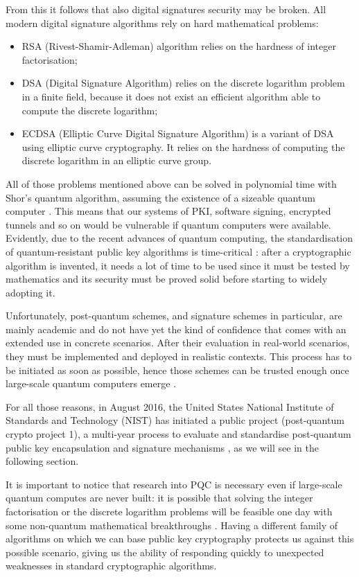 \documentclass[a4paper,12pt]{article}
\begin{document}
From this it follows that also digital signatures security may be broken. All modern digital signature algorithms rely on hard mathematical problems:
\begin{itemize}
	\item RSA (Rivest-Shamir-Adleman) algorithm relies on the hardness of integer factorisation;
	\item DSA (Digital Signature Algorithm) relies on the discrete logarithm problem in a finite field, because it does not exist an efficient algorithm able to compute the discrete logarithm;
	\item ECDSA (Elliptic Curve Digital Signature Algorithm) is a variant of DSA using elliptic curve cryptography. It relies on the hardness of computing the discrete logarithm in an elliptic curve group.
\end{itemize}

All of those problems mentioned above can be solved in polynomial time with Shor's quantum algorithm, assuming the existence of a sizeable quantum computer \cite{5_postquantum_signature_usecase}.
This means that our systems of PKI, software signing, encrypted tunnels and so on would be vulnerable if quantum computers were available.
Evidently, due to the recent advances of quantum computing, the standardisation of quantum-resistant public key algorithms is time-critical \cite{5_postquantum_signature_usecase}: after a cryptographic algorithm is invented, it needs a lot of time to be used since it must be tested by mathematics and its security must be proved solid before starting to widely adopting it.

Unfortunately, post-quantum schemes, and signature schemes in particular, are mainly academic and do not have yet the kind of confidence that comes with an extended use in concrete scenarios. After their evaluation in real-world scenarios, they must be implemented and deployed in realistic contexts. This process has to be initiated as soon as possible, hence those schemes can be trusted enough once large-scale quantum computers emerge \cite{9_postquantum_auth_openssl}.

For all those reasons, in August 2016, the United States National Institute of Standards and Technology (NIST) has initiated a public project (post-quantum crypto project 1), a multi-year process to evaluate and standardise post-quantum public key encapsulation and signature mechanisms \cite{10_postquantum_keyexchange}, as we will see in the following section.

It is important to notice that research into PQC is necessary even if large-scale quantum computes are never built: it is possible that solving the integer factorisation or the discrete logarithm problems will be feasible one day with some non-quantum mathematical breakthroughs \cite{10_postquantum_keyexchange}.
Having a different family of algorithms on which we can base public key cryptography protects us against this possible scenario, giving us the ability of responding quickly to unexpected weaknesses in standard cryptographic algorithms.
\end{document}

